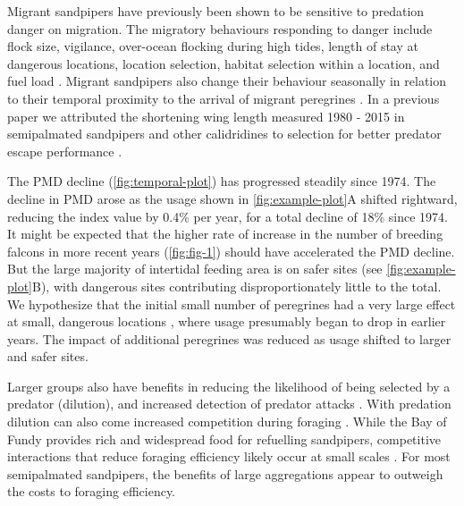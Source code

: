 Migrant sandpipers have previously been shown to be sensitive to predation danger on migration. The migratory behaviours responding to danger include flock size, vigilance, over-ocean flocking during high tides, length of stay at dangerous locations, location selection, habitat selection within a location, and fuel load \citep{Dekker1998,ydenberg_western_2004,pomeroy_tradeoffs_2006,Pomeroy2008a,Sprague2008a}. Migrant sandpipers also change their behaviour seasonally in relation to their temporal proximity to the arrival of migrant peregrines \citep{Hope2014,Hope2011}. In a previous paper \citep{Lank2017} we attributed the shortening wing length measured 1980 - 2015 in semipalmated sandpipers and other calidridines \citep{wingcalidris2019} to selection for better predator escape performance \citep[see also ][]{ydenberg_hope2019}.

The PMD decline (\autoref{fig:temporal-plot}) has progressed steadily since 1974. The decline in PMD arose as the usage shown in \autoref{fig:example-plot}A shifted rightward, reducing the index value by 0.4\% per year, for a total decline of 18\% since 1974. It might be expected that the higher rate of increase in the number of breeding falcons in more recent years (\autoref{fig:fig-1}) should have accelerated the PMD decline. But the large majority of intertidal feeding area is on safer sites (see \autoref{fig:example-plot}B), with dangerous sites contributing disproportionately little to the total. We hypothesize that the initial small number of peregrines had a very large effect at small, dangerous locations \citep[e.g. ][]{page1975raptor}, where usage presumably began to drop in earlier years. The impact of additional peregrines was reduced as usage shifted to larger and safer sites. 

Larger groups also have benefits in reducing the likelihood of being selected by a predator (dilution), and increased detection of predator attacks \citep[many eyes][]{Roberts1996,Bednekoff1998,Fernandez-Juricic2007,Pays2013}. With predation dilution can also come increased competition during foraging \citep{Stillman1997,Vahl2005,Minderman2006c}. While the Bay of Fundy provides rich and widespread food for refuelling sandpipers, competitive interactions that reduce foraging efficiency likely occur at small scales \citep{Vahl2005a,Beauchamp2009a,Beauchamp2014}. For most semipalmated sandpipers, the benefits of large aggregations appear to outweigh the costs to foraging efficiency. 


